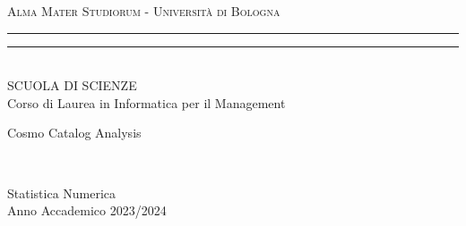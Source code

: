 \documentclass{article}
\begin{document}
    \pagestyle{empty}
    \begin{titlepage}
        \begin{center}
        {{\Large{\textsc{Alma Mater Studiorum - Università di Bologna}}}}
            \rule[0.1cm]{\textwidth}{0.1px}
            \rule[0.5cm]{\textwidth}{0.6px}\\
            {\large{SCUOLA DI SCIENZE \\ Corso di Laurea in Informatica per il Management}}
        \end{center}

        \vspace{90px}

        \begin{center}
            \LARGE Cosmo Catalog Analysis
        \end{center}

        \vspace{100px}
        \par
        \noindent
        \hfill
        \begin{minipage}[t]{0.4\textwidth}\raggedleft
        {\fontsize{12}{13}{}\
            }
        \end{minipage}

        \vspace*{140px}

        \begin{center}
            \large{Statistica Numerica}\\
            \large{Anno Accademico 2023/2024}
        \end{center}
    \end{titlepage}

    \newpage
\end{document}
